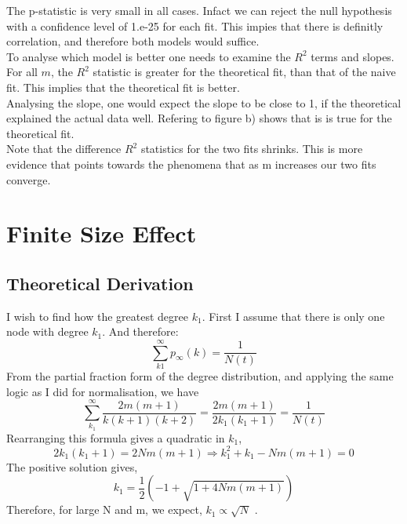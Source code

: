 \documentclass[]{article}
\begin{document}
The p-statistic is very small in all cases. Infact we can reject the null hypothesis with a confidence level of 1.e-25 for each fit. This impies that there is definitly correlation, and therefore both models would suffice.\\
To analyse which model is better one needs to examine the $R^2$ terms and slopes. For all $m$, the $R^2$ statistic is greater for the theoretical fit, than that of the naive fit. This implies that the theoretical fit is better.\\
Analysing the slope, one would expect the slope to be close to 1, if the theoretical explained the actual data well. Refering to figure b) shows that is is true for the theoretical fit. \\
Note that the difference $R^2$ statistics for the two fits shrinks. This is more evidence that points towards the phenomena that as m increases our two fits converge.    
\section{Finite Size Effect}
\subsection{Theoretical Derivation}
I wish to find how the greatest degree $k_1$. First I assume that there is only one node with degree $k_1$. And therefore:
\begin{equation}
\sum_{k1}^{\infty} p_{\infty}(k)=\frac{1}{N(t)}
\end{equation}
From the partial fraction form of the degree distribution, and applying the same logic as I did for normalisation, we have
\begin{equation}
\sum_{k_1}^{\infty}	\frac{2m(m+1)}{k(k+1)(k+2)}=\frac{2m(m+1)}{2k_1(k_1+1)}=\frac{1}{N(t)}
\end{equation}
Rearranging this formula gives a quadratic in $k_1$,
\begin{equation}
	2k_1(k_1+1)=2Nm(m+1) \Rightarrow k_{1}^{2} + k_1 -Nm(m+1)=0
\end{equation}
The positive solution gives,
\begin{equation}
	k_1 = \frac{1}{2}(-1 + \sqrt{1+4Nm(m+1)})
\end{equation}
Therefore, for large N and m, we expect, $k_1 \propto \sqrt{N}$ . 
\end{document}
